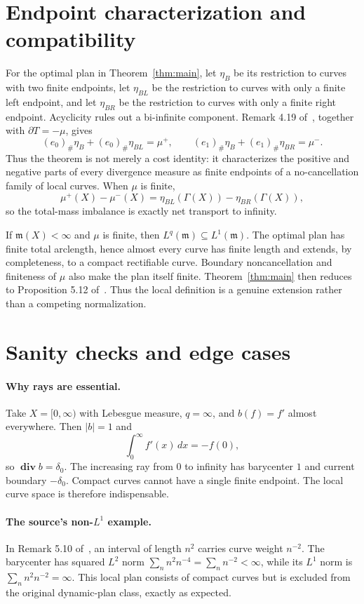 \documentclass[11pt]{article}
\newcommand{\X}{X}
\newcommand{\m}{\mathfrak m}
\newcommand{\diver}{\boldsymbol{\operatorname{div}}}
\begin{document}
\section{Endpoint characterization and compatibility}

For the optimal plan in Theorem~\ref{thm:main}, let $\eta_B$ be its restriction
to curves with two finite endpoints, let $\eta_{BL}$ be the restriction to
curves with only a finite left endpoint, and let $\eta_{BR}$ be the restriction
to curves with only a finite right endpoint.  Acyclicity rules out a
bi-infinite component.  Remark 4.19 of~\cite{ARV}, together with
$\partial T=-\mu$, gives
\[
 (e_0)_\#\eta_B+(e_0)_\#\eta_{BL}=\mu^+,
 \qquad
 (e_1)_\#\eta_B+(e_1)_\#\eta_{BR}=\mu^-.
 \tag{6.1}\label{eq:endpoints}
\]
Thus the theorem is not merely a cost identity: it characterizes the positive
and negative parts of every divergence measure as finite endpoints of a
no-cancellation family of local curves.  When $\mu$ is finite,
\[
 \mu^+(\X)-\mu^-(\X)
 =\eta_{BL}(\Gamma(\X))-\eta_{BR}(\Gamma(\X)),
 \tag{6.2}\label{eq:infinity-balance}
\]
so the total-mass imbalance is exactly net transport to infinity.

If $\m(\X)<\infty$ and $\mu$ is finite, then
$L^q(\m)\subseteq L^1(\m)$.  The optimal plan has finite total arclength,
hence almost every curve has finite length and extends, by completeness, to a
compact rectifiable curve.  Boundary noncancellation and finiteness of $\mu$
also make the plan itself finite.  Theorem~\ref{thm:main} then reduces to
Proposition 5.12 of~\cite{AIKP}.  Thus the local definition is a genuine
extension rather than a competing normalization.

\section{Sanity checks and edge cases}

\paragraph{Why rays are essential.}
Take $\X=[0,\infty)$ with Lebesgue measure, $q=\infty$, and
$b(f)=f'$ almost everywhere.  Then $|b|=1$ and
\[
 \int_0^\infty f'(x)\,dx=-f(0),
\]
so $\diver b=\delta_0$.  The increasing ray from $0$ to infinity has
barycenter $1$ and current boundary $-\delta_0$.  Compact curves cannot have a
single finite endpoint.  The local curve space is therefore indispensable.

\paragraph{The source's non-$L^1$ example.}
In Remark 5.10 of~\cite{AIKP}, an interval of length $n^2$ carries curve weight
$n^{-2}$.  The barycenter has squared $L^2$ norm
$\sum_n n^2n^{-4}=\sum_n n^{-2}<\infty$, while its $L^1$ norm is
$\sum_n n^2n^{-2}=\infty$.  This local plan consists of compact curves but is
excluded from the original dynamic-plan class, exactly as expected.
\end{document}
